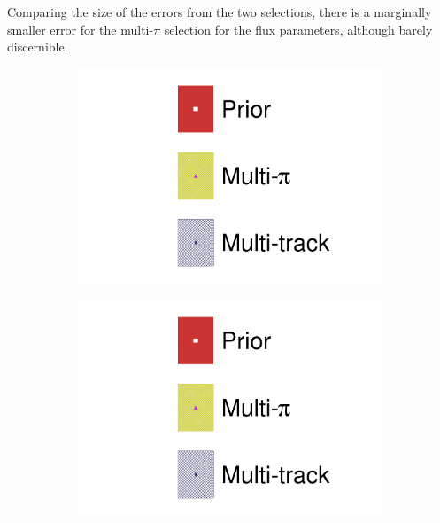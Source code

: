 Comparing the size of the errors from the two selections, there is a marginally smaller error for the multi-$\pi$ selection for the flux parameters, although barely discernible.
\begin{figure}[h]
	\centering
	\begin{subfigure}[t]{0.1\textwidth}
		\includegraphics[width=\textwidth,page=1, trim={0mm 135mm 30mm 0mm}, clip]{figures/mach3/2018/asimov/2018a_FixedCov_RedCov_Mpi_Asimov_merg_2018a_NewDetMatrix_OrderSwitched_Data2to8_merge}
	\end{subfigure}
\begin{subfigure}[t]{0.1\textwidth}
\includegraphics[width=\textwidth,page=1, trim={0mm 70mm 30mm 60mm}, clip]{figures/mach3/2018/asimov/2018a_FixedCov_RedCov_Mpi_Asimov_merg_2018a_NewDetMatrix_OrderSwitched_Data2to8_merge}

\end{subfigure}
\end{figure}
